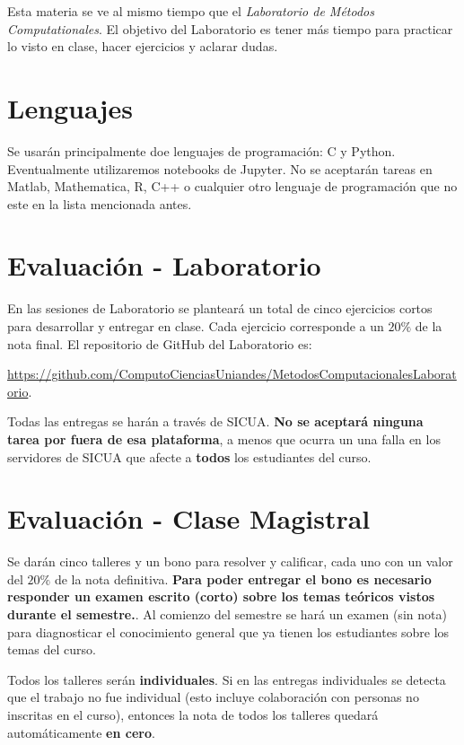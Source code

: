 \documentclass[11pt]{article}
\begin{document}
Esta materia se ve al mismo tiempo que el \emph{Laboratorio de M\'etodos
Computationales}. 
El objetivo del Laboratorio es tener m\'as tiempo para practicar lo
visto en clase, hacer ejercicios y aclarar dudas.

\section*{Lenguajes}
\noindent Se usar\'an principalmente doe lenguajes de programaci\'on:
C y Python. Eventualmente utilizaremos notebooks de Jupyter.
No se  aceptar\'an tareas en Matlab, Mathematica, R, C++ o cualquier
otro lenguaje  de programaci\'on que no este en la lista mencionada
antes.  

\section*{Evaluaci\'on - Laboratorio}

En las sesiones de Laboratorio se plantear\'a un total de cinco
ejercicios cortos para desarrollar y entregar en clase.
Cada ejercicio corresponde a un $20\%$ de la nota final.
El repositorio de GitHub del Laboratorio es:

  \url{https://github.com/ComputoCienciasUniandes/MetodosComputacionalesLaboratorio}. 


Todas las entregas se har\'an a trav\'es de SICUA. 
{\bf No se aceptar\'a ninguna tarea por fuera de esa plataforma}, a
menos que ocurra un una falla en los servidores de SICUA que afecte a
{\bf todos} los estudiantes del curso. 



\section*{Evaluaci\'on - Clase Magistral}

Se dar\'an cinco talleres y un bono para resolver y calificar, cada uno
con un valor del $20\%$ de la nota definitiva. 
\textbf{Para poder entregar el bono es necesario responder un examen
  escrito (corto) sobre los temas te\'oricos vistos durante el semestre.}. 
Al comienzo del semestre se har\'a un examen (sin nota) para
diagnosticar el conocimiento general que ya tienen los estudiantes
sobre los temas del curso.


Todos los talleres ser\'an \textbf{individuales}. 
Si en las entregas individuales se detecta que el trabajo no fue
individual (esto incluye colaboraci\'on con personas no inscritas en
el curso), entonces la nota de todos los talleres quedar\'a
autom\'aticamente {\bf en cero}.
\end{document}
